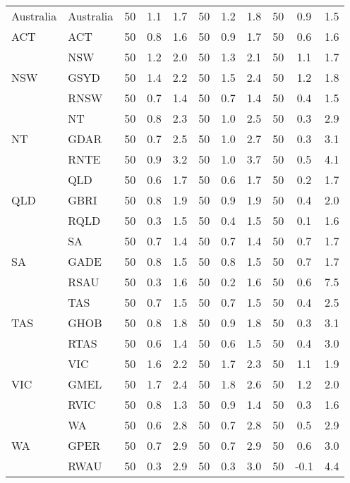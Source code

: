 \begin{table}[!ht]
{\begin{tabular}{llccccccccc}
      Australia & Australia & 50    & 1.1 & 1.7 & 50    & 1.2 & 1.8 & 50    & 0.9 & 1.5 \\
    ACT   & ACT   & 50    & 0.8 & 1.6 & 50    & 0.9 & 1.7 & 50    & 0.6 & 1.6 \\
    \multirow{3}[0]{*}{NSW} & NSW   & 50    & 1.2 & 2.0 & 50    & 1.3 & 2.1 & 50    & 1.1 & 1.7 \\
          & GSYD  & 50    & 1.4 & 2.2 & 50    & 1.5 & 2.4 & 50    & 1.2 & 1.8 \\
          & RNSW  & 50    & 0.7 & 1.4 & 50    & 0.7 & 1.4 & 50    & 0.4 & 1.5 \\
    \multirow{3}[0]{*}{NT} & NT    & 50    & 0.8 & 2.3 & 50    & 1.0 & 2.5 & 50    & 0.3 & 2.9 \\
          & GDAR  & 50    & 0.7 & 2.5 & 50    & 1.0 & 2.7 & 50    & 0.3 & 3.1 \\
          & RNTE  & 50    & 0.9 & 3.2 & 50    & 1.0 & 3.7 & 50    & 0.5 & 4.1 \\
    \multirow{3}[0]{*}{QLD} & QLD   & 50    & 0.6 & 1.7 & 50    & 0.6 & 1.7 & 50    & 0.2 & 1.7 \\
          & GBRI  & 50    & 0.8 & 1.9 & 50    & 0.9 & 1.9 & 50    & 0.4 & 2.0 \\
          & RQLD  & 50    & 0.3 & 1.5 & 50    & 0.4 & 1.5 & 50    & 0.1 & 1.6 \\
    \multirow{3}[0]{*}{SA} & SA    & 50    & 0.7 & 1.4 & 50    & 0.7 & 1.4 & 50    & 0.7 & 1.7 \\
          & GADE  & 50    & 0.8 & 1.5 & 50    & 0.8 & 1.5 & 50    & 0.7 & 1.7 \\
          & RSAU  & 50    & 0.3 & 1.6 & 50    & 0.2 & 1.6 & 50    & 0.6 & 7.5 \\
    \multirow{3}[0]{*}{TAS} & TAS   & 50    & 0.7 & 1.5 & 50    & 0.7 & 1.5 & 50    & 0.4 & 2.5 \\
          & GHOB  & 50    & 0.8 & 1.8 & 50    & 0.9 & 1.8 & 50    & 0.3 & 3.1 \\
          & RTAS  & 50    & 0.6 & 1.4 & 50    & 0.6 & 1.5 & 50    & 0.4 & 3.0 \\
    \multirow{3}[0]{*}{VIC} & VIC   & 50    & 1.6 & 2.2 & 50    & 1.7 & 2.3 & 50    & 1.1 & 1.9 \\
          & GMEL  & 50    & 1.7 & 2.4 & 50    & 1.8 & 2.6 & 50    & 1.2 & 2.0 \\
          & RVIC  & 50    & 0.8 & 1.3 & 50    & 0.9 & 1.4 & 50    & 0.3 & 1.6 \\
    \multirow{3}[1]{*}{WA} & WA    & 50    & 0.6 & 2.8 & 50    & 0.7 & 2.8 & 50    & 0.5 & 2.9 \\
          & GPER  & 50    & 0.7 & 2.9 & 50    & 0.7 & 2.9 & 50    & 0.6 & 3.0 \\
          & RWAU  & 50    & 0.3 & 2.9 & 50    & 0.3 & 3.0 & 50    & -0.1 & 4.4 \\

  
  
    \bottomrule
    \end{tabular}%
 
  }
  
  
  
\end{table}%
